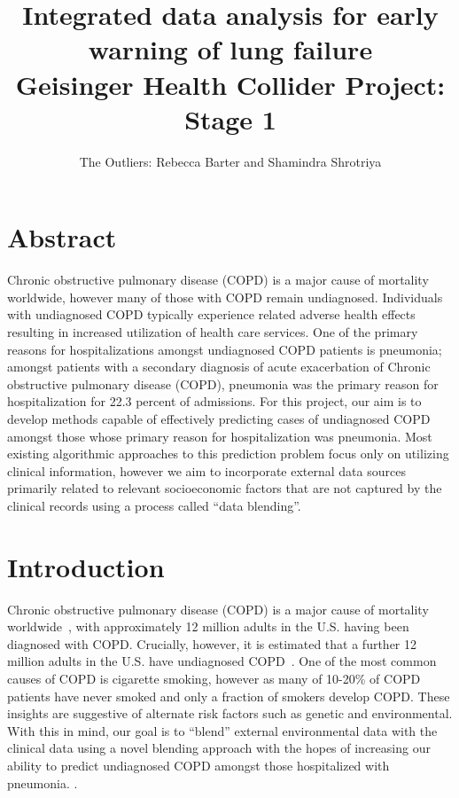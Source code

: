 \documentclass{article}
\title{Integrated data analysis for early warning of lung failure \\ \large{Geisinger Health Collider Project: Stage 1}}
\author{The Outliers: Rebecca Barter and Shamindra Shrotriya}
\begin{document}
\maketitle

\section{Abstract}

Chronic obstructive pulmonary disease (COPD) is a major cause of mortality worldwide, however many of those with COPD remain undiagnosed. Individuals with undiagnosed COPD typically experience related adverse health effects resulting in increased utilization of health care services. One of the primary reasons for hospitalizations amongst undiagnosed COPD patients is pneumonia; amongst patients with a secondary diagnosis of acute exacerbation of Chronic obstructive pulmonary disease (COPD), pneumonia was the primary reason for hospitalization for 22.3 percent of admissions. For this project, our aim is to develop methods capable of effectively predicting cases of undiagnosed COPD amongst those whose primary reason for hospitalization was pneumonia. Most existing algorithmic approaches to this prediction problem focus only on utilizing clinical information, however we aim to incorporate external data sources primarily related to relevant socioeconomic factors that are not captured by the clinical records using a process called ``data blending''. 

\section{Introduction}

Chronic obstructive pulmonary disease (COPD) is a major cause of mortality worldwide~\cite{lozano_global_2012}, with approximately 12 million adults in the U.S. having been diagnosed with COPD. Crucially, however, it is estimated that a further 12 million adults in the U.S. have undiagnosed COPD~\cite{nih_chronic_2010}. One of the most common causes of COPD is cigarette smoking, however as many of 10-20\% of COPD patients have never smoked and only a fraction of smokers develop COPD. These insights are suggestive of alternate risk factors such as genetic and environmental. With this in mind, our goal is to ``blend'' external environmental data with the clinical data using a novel blending approach with the hopes of increasing our ability to predict undiagnosed COPD amongst those hospitalized with pneumonia. . 
\end{document}
